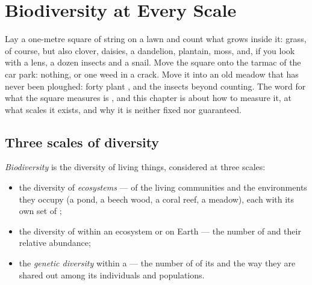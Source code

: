 \chapter{Biodiversity at Every Scale}\label{ch:g10:biodiversity-scales}

Lay a one-metre square of string on a lawn and count what grows inside
it: grass, of course, but also clover, daisies, a dandelion, plantain,
moss, and, if you look with a lens, a dozen insects and a snail. Move
the square onto the tarmac of the car park: nothing, or one weed in a
crack. Move it into an old meadow that has never been ploughed: forty
plant , and the insects beyond counting. The word for what the
square measures is \emph{}, and this chapter is about how to
measure it, at what scales it exists, and why it is neither fixed nor
guaranteed.

\section{Three scales of diversity}

\begin{definition}[Biodiversity]\label{def:g10:biodiversity-scales:biodiversity}
\emph{Biodiversity} is the diversity of living
things, considered at three scales:
\begin{itemize}
  \item the diversity of \emph{ecosystems} --- of the
        living communities and the environments they occupy (a pond,
        a beech wood, a coral reef, a meadow), each with its own set of
        ;
  \item the diversity of  within an
        ecosystem or on Earth --- the number of  and their
        relative abundance;
  \item the \emph{genetic diversity} within a
         --- the number of  of its  and the way
        they are shared out among its individuals and populations.
\end{itemize}
\end{definition}

